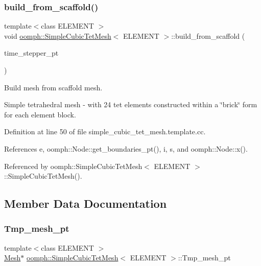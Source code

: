\subsubsection{\texorpdfstring{build\+\_\+from\+\_\+scaffold()}{build\_from\_scaffold()}}
{\footnotesize\ttfamily template$<$class E\+L\+E\+M\+E\+NT $>$ \\
void \hyperlink{classoomph_1_1SimpleCubicTetMesh}{oomph\+::\+Simple\+Cubic\+Tet\+Mesh}$<$ E\+L\+E\+M\+E\+NT $>$\+::build\+\_\+from\+\_\+scaffold (\begin{DoxyParamCaption}\item[{\hyperlink{classoomph_1_1TimeStepper}{Time\+Stepper} $\ast$}]{time\+\_\+stepper\+\_\+pt }\end{DoxyParamCaption})\hspace{0.3cm}{\ttfamily [private]}}



Build mesh from scaffold mesh. 

Simple tetrahedral mesh -\/ with 24 tet elements constructed within a \char`\"{}brick\char`\"{} form for each element block. 

Definition at line 50 of file simple\+\_\+cubic\+\_\+tet\+\_\+mesh.\+template.\+cc.



References e, oomph\+::\+Node\+::get\+\_\+boundaries\+\_\+pt(), i, s, and oomph\+::\+Node\+::x().



Referenced by oomph\+::\+Simple\+Cubic\+Tet\+Mesh$<$ E\+L\+E\+M\+E\+N\+T $>$\+::\+Simple\+Cubic\+Tet\+Mesh().



\subsection{Member Data Documentation}
\mbox{\label{classoomph_1_1SimpleCubicTetMesh_a125fc9ec4d3d74e147ac7f17f867e1a3}} 
\subsubsection{\texorpdfstring{Tmp\+\_\+mesh\+\_\+pt}{Tmp\_mesh\_pt}}
{\footnotesize\ttfamily template$<$class E\+L\+E\+M\+E\+NT $>$ \\
\hyperlink{classoomph_1_1Mesh}{Mesh}$\ast$ \hyperlink{classoomph_1_1SimpleCubicTetMesh}{oomph\+::\+Simple\+Cubic\+Tet\+Mesh}$<$ E\+L\+E\+M\+E\+NT $>$\+::Tmp\+\_\+mesh\+\_\+pt\hspace{0.3cm}{\ttfamily [private]}}



